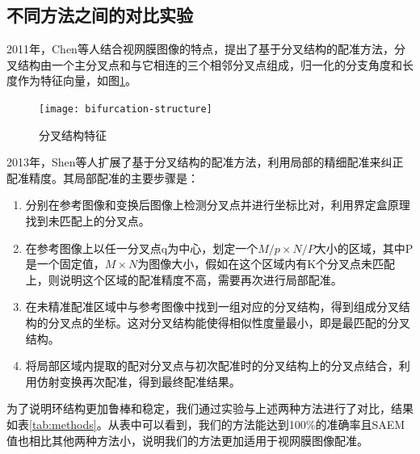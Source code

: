 \subsection{不同方法之间的对比实验}

2011年，Chen\cite{chen2011retinal,chen2015retinal}等人结合视网膜图像的特点，提出了基于分叉结构的配准方法，分叉结构由一个主分叉点和与它相连的三个相邻分叉点组成，归一化的分支角度和长度作为特征向量，如图\ref{fig:bifurcation structure}。

\begin{figure}[!ht]
  \centering
  \texttt{[image: bifurcation-structure]}
  \caption{分叉结构特征}
  \label{fig:bifurcation structure}
\end{figure}

2013年，Shen\cite{shen2012blood}等人扩展了基于分叉结构的配准方法，利用局部的精细配准来纠正配准精度。其局部配准的主要步骤是：
\begin{enumerate}
\item 分别在参考图像和变换后图像上检测分叉点并进行坐标比对，利用界定盒原理找到未匹配上的分叉点。
\item 在参考图像上以任一分叉点q为中心，划定一个$M / p \times N / P$大小的区域，其中P是一个固定值，$M \times N$为图像大小，假如在这个区域内有K个分叉点未匹配上，则说明这个区域的配准精度不高，需要再次进行局部配准。
\item 在未精准配准区域中与参考图像中找到一组对应的分叉结构，得到组成分叉结构的分叉点的坐标。这对分叉结构能使得相似性度量最小，即是最匹配的分叉结构。
\item 将局部区域内提取的配对分叉点与初次配准时的分叉结构上的分叉点结合，利用仿射变换再次配准，得到最终配准结果。
\end{enumerate}

为了说明环结构更加鲁棒和稳定，我们通过实验与上述两种方法进行了对比，结果如表\ref{tab:methods}。从表中可以看到，我们的方法能达到100\%的准确率且SAEM值也相比其他两种方法小，说明我们的方法更加适用于视网膜图像配准。

